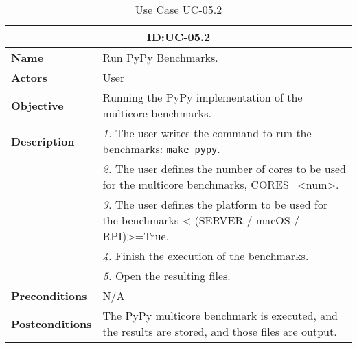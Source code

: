 \begin{table}[H]
    \centering
    \begin{tabular}{l p{10cm}}
        \toprule
        \multicolumn{2}{c}{\textbf{ID:\@ UC-05.2}} \\
        \toprule
        \textbf{Name}                         &  Run PyPy Benchmarks. \\
        \textbf{Actors}                       &  User \\
        \textbf{Objective}                    &  Running the PyPy implementation of the multicore benchmarks. \\
        \multirow{1}{*}{\textbf{Description}} & \textsl{1.} The user writes the command to run the benchmarks: \texttt{make pypy}.\\
                                              & \textsl{2.} The user defines the number of cores to be used for the multicore benchmarks, CORES=<num>.\\
                                              & \textsl{3.} The user defines the platform to be used for the benchmarks < (SERVER / macOS / RPI)>=True.\\
                                              & \textsl{4.} Finish the execution of the benchmarks.\\
                                              & \textsl{5.} Open the resulting files.\\
        \textbf{Preconditions}                &  N/A \\
        \textbf{Postconditions}               &  The PyPy multicore benchmark is executed, and the results are stored, and those files are output. \\
    \end{tabular}
    \caption{Use Case UC-05.2}\label{tab:uc-05.2}
\end{table}



